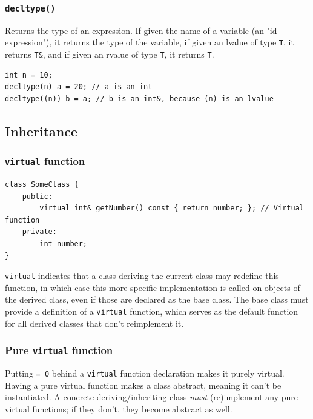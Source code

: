 \documentclass[table, xcdraw]{article}%
\begin{document}
\subsubsection{\texttt{decltype()}}

Returns the type of an expression. If given the name of a variable (an "id-expression"), it returns the type of the variable, if given an lvalue of type \texttt{T}, it returns \texttt{T&}, and if given an rvalue of type \texttt{T}, it returns \texttt{T}.

\begin{verbatim}
int n = 10;
decltype(n) a = 20; // a is an int
decltype((n)) b = a; // b is an int&, because (n) is an lvalue
\end{verbatim}

\subsection{Inheritance}

\subsubsection{\texttt{virtual} function} \label{virtual}

\begin{verbatim}
class SomeClass {
    public:
        virtual int& getNumber() const { return number; }; // Virtual function
    private:
        int number;
}
\end{verbatim}

\texttt{virtual} indicates that a class deriving the current class may redefine this function, in which case this more specific implementation is called on objects of the derived class, even if those are declared as the base class. The base class must provide a definition of a \texttt{virtual} function, which serves as the default function for all derived classes that don't reimplement it.

\subsubsection{Pure \texttt{virtual} function} \label{purevirtual}

Putting \texttt{= 0} behind a \texttt{virtual} function declaration makes it purely virtual. Having a pure virtual function makes a class abstract, meaning it can't be instantiated. A concrete deriving/inheriting class \emph{must} (re)implement any pure virtual functions; if they don't, they become abstract as well.
\end{document}
